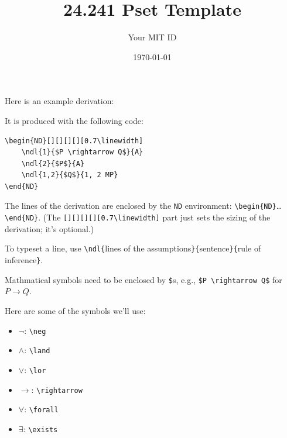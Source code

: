 \documentclass{article}
\title{24.241 Pset Template}
\author{Your MIT ID}
\date{\today}
\begin{document}
\maketitle

Here is an example derivation:

\begin{ND}[][][][][0.7\linewidth]
\end{ND}

It is produced with the following code:

\begin{verbatim}
\begin{ND}[][][][][0.7\linewidth]
    \ndl{1}{$P \rightarrow Q$}{A}
    \ndl{2}{$P$}{A}
    \ndl{1,2}{$Q$}{1, 2 MP}
\end{ND}
\end{verbatim}

The lines of the derivation are enclosed by the \verb|ND| environment: \verb|\begin{ND}|\ldots\verb|\end{ND}|. (The \verb|[][][][][0.7\linewidth]| part just sets the sizing of the derivation; it's optional.)

To typeset a line, use \verb|\ndl{|lines of the assumptions\verb|}{|sentence\verb|}{|rule of inference\verb|}|.

Mathmatical symbols need to be enclosed by \verb|$|s, e.g., \verb|$P \rightarrow Q$| for $P \rightarrow Q$.

Here are some of the symbols we'll use:

\begin{itemize}
    \item $\neg$: \verb|\neg|
    \item $\land$: \verb|\land|
    \item $\lor$: \verb|\lor|
    \item $\rightarrow$: \verb|\rightarrow|
    \item $\forall$: \verb|\forall|
    \item $\exists$: \verb|\exists|
\end{itemize}
\end{document}
